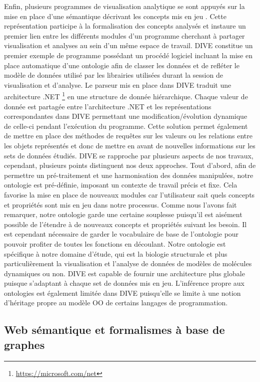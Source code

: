 Enfin, plusieurs programmes de visualisation analytique se sont appuyés sur la mise en place d'une sémantique décrivant les concepts mis en jeu \cite{rysavy_dive:_2014}. Cette représentation participe à la formalisation des concepts analysés et instaure un premier lien entre les différents modules d'un programme cherchant à partager visualisation et analyses au sein d'un même espace de travail. DIVE constitue un premier exemple de programme possédant un procédé logiciel incluant la mise en place automatique d'une ontologie afin de classer les données et de refléter le modèle de données utilisé par les librairies utilisées durant la session de visualisation et d'analyse. Le parseur mis en place dans DIVE traduit une architecture .NET \footnote{\url{https://microsoft.com/net}} en une structure de donnée hiérarchique. Chaque valeur de donnée est partagée entre l'architecture .NET et les représentations correspondantes dans DIVE permettant une modification/évolution dynamique de celle-ci pendant l’exécution du programme. Cette solution permet également de mettre en place des méthodes de requêtes sur les valeurs ou les relations entre les objets représentés et donc de mettre en avant de nouvelles informations sur les sets de données étudiés. DIVE se rapproche par plusieurs aspects de nos travaux, cependant, plusieurs points distinguent nos deux approches. Tout d'abord, afin de permettre un pré-traitement et une harmonisation des données manipulées, notre ontologie est pré-définie, imposant un contexte de travail précis et fixe. Cela favorise la mise en place de nouveaux modules car l'utilisateur sait quels concepts et propriétés sont mis en jeu dans notre processus. Comme nous l'avons fait remarquer, notre ontologie garde une certaine souplesse puisqu'il est aisément possible de l'étendre à de nouveaux concepts et propriétés suivant les besoin. Il est cependant nécessaire de garder le vocabulaire de base de l'ontologie pour pouvoir profiter de toutes les fonctions en découlant. Notre ontologie est spécifique à notre domaine d'étude, qui est la biologie structurale et plus particulièrement la visualisation et l'analyse de données de modèles de molécules dynamiques ou non. DIVE est capable de fournir une architecture plus globale puisque s'adaptant à chaque set de données mis en jeu. L'inférence propre aux ontologies est également limitée dans DIVE puisqu'elle se limite à une notion d'héritage propre au modèle OO de certains langages de programmation.


\subsection{Web sémantique et formalismes à base de graphes}


